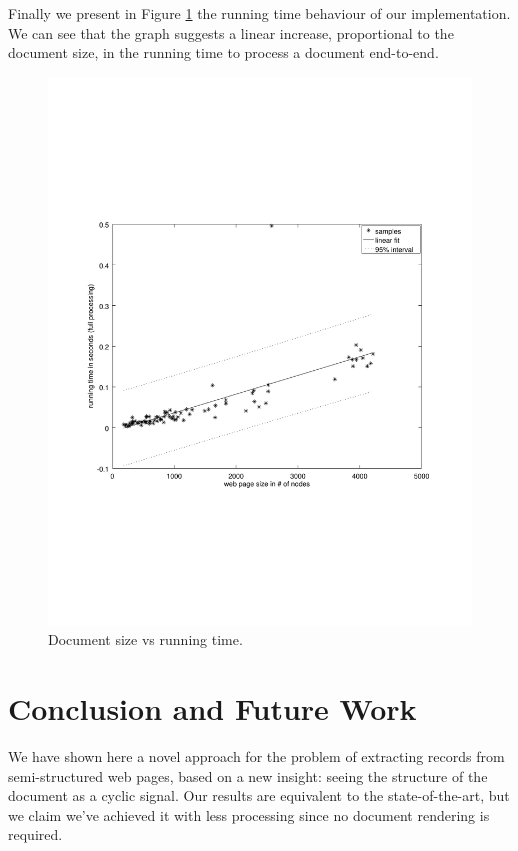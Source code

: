 \documentclass{vldb}
\begin{document}
Finally we present in Figure \ref{fig:runtime} the running time behaviour of our
implementation. We can see that the graph suggests a linear increase,
proportional to the document size, in the running time to process a document
end-to-end.

\begin{figure}[h]
  \centering
     \includegraphics[trim={2.5cm 7.5cm 1cm 6.5cm}, width=\linewidth
     ]{img/runtime.pdf}
  \caption{Document size vs running time.}
  \label{fig:runtime}
\end{figure}


\section{Conclusion and Future Work}\label{sec:con}

We have shown here a novel approach for the problem of extracting records from
semi-structured web pages, based on a new insight: seeing the structure of the
document as a cyclic signal. Our results are equivalent to the state-of-the-art,
but we claim we've achieved it with less processing since no document rendering
is required.
\end{document}
